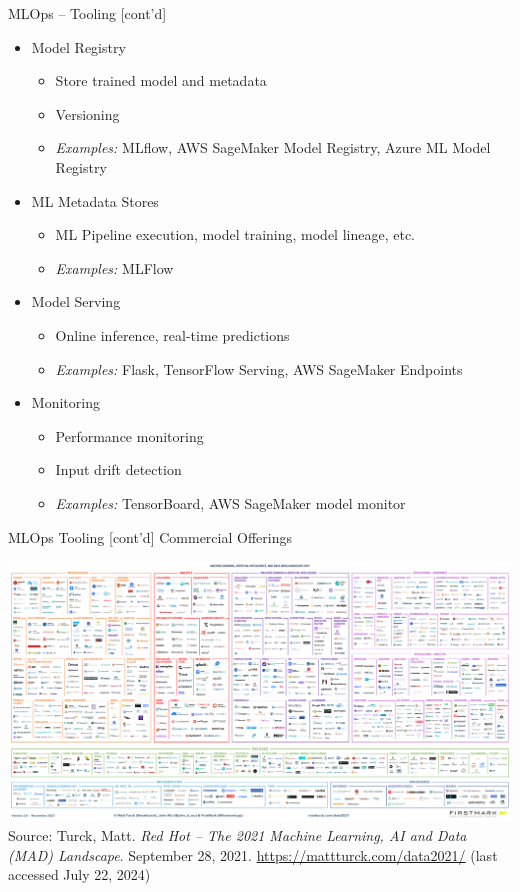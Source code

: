 \documentclass[ignorenonframetext,xcolor=x11names]{beamer}
\begin{document}
\begin{frame}{MLOps -- Tooling \small [cont'd]}
\begin{itemize}
  \item Model Registry
  \begin{itemize}
  \footnotesize
      \item Store trained model and metadata
      \item Versioning
      \item \emph{Examples:} MLflow, AWS SageMaker Model Registry, Azure ML Model Registry
  \end{itemize}
  \item ML Metadata Stores
  \begin{itemize}
  \footnotesize
     \item ML Pipeline execution, model training, model lineage, etc.
     \item \emph{Examples:} MLFlow
  \end{itemize}
  \item Model Serving
  \begin{itemize}
  \footnotesize
     \item Online inference, real-time predictions
     \item \emph{Examples:} Flask, TensorFlow Serving, AWS SageMaker Endpoints
  \end{itemize}
  \item Monitoring
  \begin{itemize}
  \footnotesize
     \item Performance monitoring
     \item Input drift detection
     \item \emph{Examples:} TensorBoard, AWS SageMaker model monitor
  \end{itemize}
\end{itemize}
\end{frame}

\begin{frame}{MLOps Tooling \small [cont'd]}
\centering
\large Commercial Offerings

\href{https://mattturck.com/wp-content/uploads/2021/12/2021-MAD-Landscape-v3.pdf}{
\includegraphics[width=\textwidth]{2021-MAD-Landscape-v3.pdf}} \\

\scriptsize Source: Turck, Matt. \textit{Red Hot -- The 2021 Machine Learning, AI and Data (MAD) Landscape}. September 28, 2021. \url{https://mattturck.com/data2021/} (last accessed July 22, 2024)
\end{frame}
\end{document}
